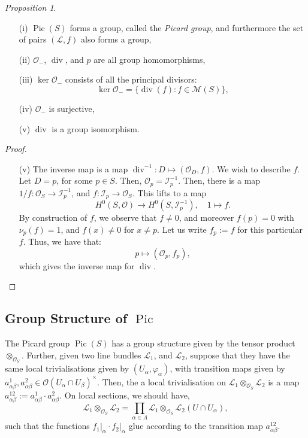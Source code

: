 \documentclass[a4paper]{report}
\theoremstyle{definition}
\theoremstyle{remark}
\theoremstyle{proposition}
\newtheorem{proposition}{Proposition}
\theoremstyle{conjecture}
\theoremstyle{lemma}
\theoremstyle{corollary}
\theoremstyle{exercise}
\theoremstyle{example}
\newcommand{\mcal}{\mathcal}
\newcommand{\on}{\operatorname}
\begin{document}
\begin{proposition}
    \leavevmode
    \begin{itemize}
        \item[(i)] $\on{Pic}(S)$ forms a group, called the \emph{Picard group},
            and furthermore the set of pairs 
            $(\mcal{L},f)$ also forms a group,
        \item[(ii)] $\mcal{O}_-$, $\on{div}$, and $p$ are all group 
            homomorphisms,
        \item[(iii)] $\ker \mcal{O}_-$ consists of all the principal
            divisors: 
            $$\ker\mcal{O}_- = \lbrace \on{div}(f) : f \in \mcal{M}(S)\rbrace,$$
        \item[(iv)] $\mcal{O}_-$ is surjective,
        \item[(v)] $\on{div}$ is a group isomorphism.
    \end{itemize}
\end{proposition}

\begin{proof}
    \leavevmode
    \begin{itemize}
        \item[(v)] The inverse map is a map $\on{div}^{-1} : D \mapsto (\mcal{O}_D,f)$.
            We wish to describe $f$.
            Let $D=p$, for some $p \in S$. Then, $\mcal{O}_p = \mcal{I}_p^{-1}$.
            Then, there is a map $1/f : \mcal{O}_S \to \mcal{I}_p^{-1}$,
            and $f : \mcal{I}_p \to \mcal{O}_S$.
            This lifts to a map 
            $$H^0(S,\mcal{O}) \longrightarrow H^0(S,\mcal{I}_p^{-1}),\quad 1 \longmapsto f.$$
            By construction of $f$, we observe that $f\neq 0$, and moreover 
            $f(p) = 0$ with $\nu_p(f) = 1$, and $f(x) \neq 0$ for $x\neq p$.
            Let us write $f_p := f$ for this particular $f$.
            Thus, we have that: $$p\longmapsto (\mcal{O}_p,f_p),$$ 
            which gives the inverse map for $\on{div}$.
    \end{itemize}
\end{proof}


\subsection{Group Structure of $\on{Pic}$}

The Picard group $\on{Pic}(S)$ has a group structure given by the tensor 
product $\otimes_{\mcal{O}_S}$. Further, given 
two line bundles $\mcal{L}_1$, and $\mcal{L}_2$, 
suppose that they have the same local trivialisations
given by $(U_\alpha,\varphi_\alpha)$, with transition maps 
given by $a^1_{\alpha\beta},a^2_{\alpha\beta}\in\mcal{O}(U_\alpha\cap U_\beta)^\times$. Then, the a local trivialisation
on $\mcal{L}_1\otimes_{\mcal{O}_S}\mcal{L}_2$ is a map $a^{12}_{\alpha\beta} :=a^1_{\alpha\beta}\cdot a^2_{\alpha\beta}$.
On local sections, we should have,
$$\mcal{L}_1\otimes_{\mcal{O}_S}\mcal{L}_2 = \prod_{\alpha \in\Lambda} \mcal{L}_1\otimes_{\mcal{O}_S} \mcal{L}_2 (U\cap U_\alpha),$$
such that the functions $f_1\vert_{\alpha}\cdot f_2\vert_{\alpha}$ 
glue according to the transition map $a^{12}_{\alpha\beta}$.
\end{document}
